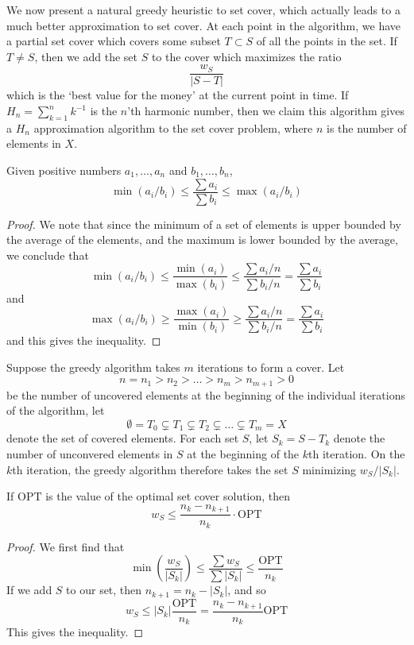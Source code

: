 We now present a natural greedy heuristic to set cover, which actually leads to a much better approximation to set cover. At each point in the algorithm, we have a partial set cover which covers some subset $T \subset S$ of all the points in the set. If $T \neq S$, then we add the set $S$ to the cover which maximizes the ratio
%
\[ \frac{w_S}{|S - T|}  \]
%
which is the `best value for the money' at the current point in time. If $H_n = \sum_{k = 1}^n k^{-1}$ is the $n$'th harmonic number, then we claim this algorithm gives a $H_n$ approximation algorithm to the set cover problem, where $n$ is the number of elements in $X$.

\begin{lemma}
    Given positive numbers $a_1, \dots, a_n$ and $b_1, \dots, b_n$,
    \[ \min (a_i/b_i) \leq \frac{\sum a_i}{\sum b_i} \leq \max (a_i/b_i) \]
\end{lemma}
\begin{proof}
    We note that since the minimum of a set of elements is upper bounded by the average of the elements, and the maximum is lower bounded by the average, we conclude that
    \[ \min(a_i/b_i) \leq \frac{\min(a_i)}{\max(b_i)} \leq \frac{\sum a_i/n}{\sum b_i/n} = \frac{\sum a_i}{\sum b_i} \]
    and
    \[ \max(a_i/b_i) \geq \frac{\max(a_i)}{\min(b_i)} \geq \frac{\sum a_i/n}{\sum b_i/n} = \frac{\sum a_i}{\sum b_i} \]
    and this gives the inequality.
\end{proof}

Suppose the greedy algorithm takes $m$ iterations to form a cover. Let
%
\[ n = n_1 > n_2 > \dots > n_m > n_{m+1} > 0 \]
%
be the number of uncovered elements at the beginning of the individual iterations of the algorithm, let
%
\[ \emptyset = T_0 \subsetneq T_1 \subsetneq T_2 \subsetneq \dots \subsetneq T_m = X \]
%
denote the set of covered elements. For each set $S$, let $S_k = S - T_k$ denote the number of unconvered elements in $S$ at the beginning of the $k$th iteration. On the $k$th iteration, the greedy algorithm therefore takes the set $S$ minimizing $w_S/|S_k|$.

\begin{lemma}
    If $\text{OPT}$ is the value of the optimal set cover solution, then
    \[ w_S \leq \frac{n_k - n_{k+1}}{n_k} \cdot \text{OPT} \]
\end{lemma}
\begin{proof}
    We first find that
    \[ \min \left( \frac{w_S}{|S_k|} \right) \leq \frac{\sum w_S}{\sum |S_k|} \leq \frac{\text{OPT}}{n_k} \]
    If we add $S$ to our set, then $n_{k+1} = n_k - |S_k|$, and so
    \[ w_S \leq |S_k| \frac{\text{OPT}}{n_k} = \frac{n_k - n_{k+1}}{n_k} \text{OPT} \]
    This gives the inequality.
\end{proof}

